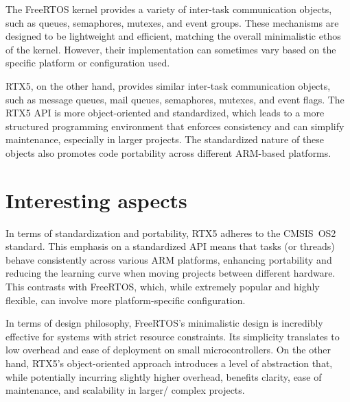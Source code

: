 The FreeRTOS kernel provides a variety of inter-task communication objects, such as queues, semaphores, mutexes, and event groups.
These mechanisms are designed to be lightweight and efficient, matching the overall minimalistic ethos of the kernel.
However, their implementation can sometimes vary based on the specific platform or configuration used.

RTX5, on the other hand, provides similar inter-task communication objects, such as message queues, mail queues, semaphores, mutexes, and event flags.
The RTX5 API is more object-oriented and standardized, which leads to a more structured programming environment that enforces consistency and can simplify maintenance, especially in larger projects.
The standardized nature of these objects also promotes code portability across different ARM-based platforms.

\section*{Interesting aspects}

In terms of standardization and portability, RTX5 adheres to the CMSIS OS2 standard.
This emphasis on a standardized API means that tasks (or threads) behave consistently across various ARM platforms, enhancing portability and reducing the learning curve when moving projects between different hardware.
This contrasts with FreeRTOS, which, while extremely popular and highly flexible, can involve more platform-specific configuration.

In terms of design philosophy, FreeRTOS’s minimalistic design is incredibly effective for systems with strict resource constraints.
Its simplicity translates to low overhead and ease of deployment on small microcontrollers.
On the other hand, RTX5’s object-oriented approach introduces a level of abstraction that, while potentially incurring slightly higher overhead, benefits clarity, ease of maintenance, and scalability in larger/ complex projects.

